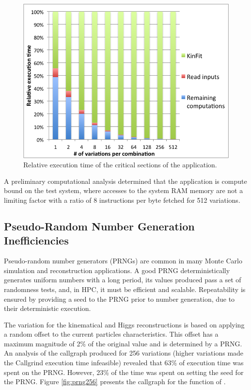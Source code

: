 \begin{figure}[!htp]
	\begin{center}
		\includegraphics[scale=0.4]{charts/relative_exec_time_kinfit_rest.png}
		\caption{Relative execution time of the critical sections of the \tth application.}
		\label{fig:ttDilepKinFit}
	\end{center}
\end{figure}

A preliminary computational analysis determined that the application is compute bound on the test system, where accesses to the system RAM memory are not a limiting factor with a ratio of 8 instructions per byte fetched for 512 variations.

\subsection{Pseudo-Random Number Generation Inefficiencies}

Pseudo-random number generators (PRNGs) are common in many Monte Carlo simulation and reconstruction applications. A good PRNG deterministically generates uniform numbers with a long period, its values produced pass a set of randomness tests, and, in HPC, it must be efficient and scalable. Repeatability is ensured by providing a seed to the PRNG prior to number generation, due to their deterministic execution.

The variation for the kinematical and Higgs reconstructions is based on applying a random offset to the current particles characteristics. This offset has a maximum magnitude of 2\% of the original value and is determined by a PRNG. An analysis of the callgraph produced for 256 variations (higher variations made the Callgrind execution time infeasible) revealed that 63\% of \tth execution time was spent on the PRNG. However, 23\% of the time was spent on setting the seed for the PRNG. Figure \ref{fig:prng256} presents the callgraph for the \ttDilepKinFit function of \tth.

